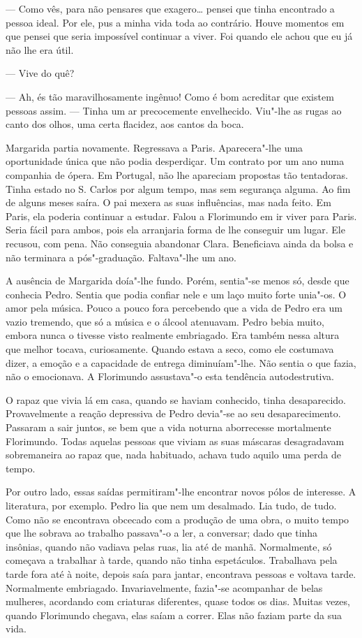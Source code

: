 --- Como vês, para não pensares que exagero\ldots{} pensei que tinha encontrado
a pessoa ideal. Por ele, pus a minha vida toda ao contrário. Houve
momentos em que pensei que seria impossível continuar a viver. Foi
quando ele achou que eu já não lhe era útil.

--- Vive do quê?

--- Ah, és tão maravilhosamente ingênuo! Como é bom acreditar que existem
pessoas assim. --- Tinha um ar precocemente envelhecido. Viu"-lhe as rugas
ao canto dos olhos, uma certa flacidez, aos cantos da boca.

Margarida partia novamente. Regressava a Paris. Aparecera"-lhe uma
oportunidade única que não podia desperdiçar. Um contrato por um ano
numa companhia de ópera. Em Portugal, não lhe apareciam propostas tão
tentadoras. Tinha estado no S. Carlos por algum tempo, mas sem segurança
alguma. Ao fim de alguns meses saíra. O pai mexera as suas influências,
mas nada feito. Em Paris, ela poderia continuar a estudar. Falou a
Florimundo em ir viver para Paris. Seria fácil para ambos, pois ela
arranjaria forma de lhe conseguir um lugar. Ele recusou, com pena. Não
conseguia abandonar Clara. Beneficiava ainda da bolsa e não terminara a
pós"-graduação. Faltava"-lhe um ano.

A ausência de Margarida doía"-lhe fundo. Porém, sentia"-se menos só, desde
que conhecia Pedro. Sentia que podia confiar nele e um laço muito forte
unia"-os. O amor pela música. Pouco a pouco fora percebendo que a vida de
Pedro era um vazio tremendo, que só a música e o álcool atenuavam. Pedro
bebia muito, embora nunca o tivesse visto realmente embriagado. Era
também nessa altura que melhor tocava, curiosamente. Quando estava a
seco, como ele costumava dizer, a emoção e a capacidade de entrega
diminuíam"-lhe. Não sentia o que fazia, não o emocionava. A Florimundo
assustava"-o esta tendência autodestrutiva.

O rapaz que vivia lá em casa, quando se haviam conhecido, tinha
desaparecido. Provavelmente a reação depressiva de Pedro devia"-se ao
seu desaparecimento. Passaram a sair juntos, se bem que a vida noturna
aborrecesse mortalmente Florimundo. Todas aquelas pessoas que viviam as
suas máscaras desagradavam sobremaneira ao rapaz que, nada habituado,
achava tudo aquilo uma perda de tempo.

Por outro lado, essas saídas permitiram"-lhe encontrar novos pólos de
interesse. A literatura, por exemplo. Pedro lia que nem um desalmado.
Lia tudo, de tudo. Como não se encontrava obcecado com a produção de uma
obra, o muito tempo que lhe sobrava ao trabalho passava"-o a ler, a
conversar; dado que tinha insônias, quando não vadiava pelas ruas, lia
até de manhã. Normalmente, só começava a trabalhar à tarde, quando não
tinha espetáculos. Trabalhava pela tarde fora até à noite, depois saía
para jantar, encontrava pessoas e voltava tarde. Normalmente embriagado.
Invariavelmente, fazia"-se acompanhar de belas mulheres, acordando com
criaturas diferentes, quase todos os dias. Muitas vezes, quando
Florimundo chegava, elas saíam a correr. Elas não faziam parte da sua
vida.


